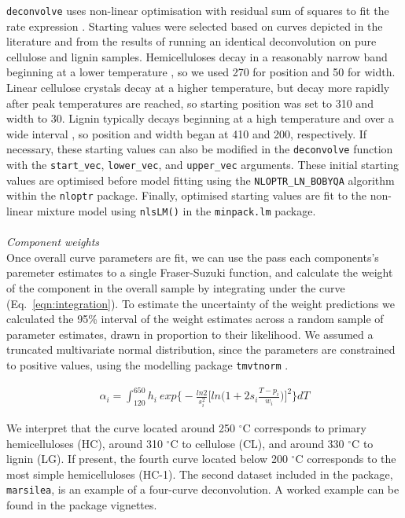 \documentclass{jors}\usepackage[]{graphicx}\usepackage[]{color}
\begin{document}
\verb|deconvolve| uses non-linear optimisation with residual sum of squares to fit the rate expression \citetext{as in \citealp{cheng2015}}. Starting values were selected based on curves depicted in the literature \citep{muller-hagedorn2007} and from the results of running an identical deconvolution on pure cellulose and lignin samples. Hemicelluloses decay in a reasonably narrow band beginning at a lower temperature \citep{muller-hagedorn2007}, so we used 270 for position and 50 for width. Linear cellulose crystals decay at a higher temperature, but decay more rapidly after peak temperatures are reached, so starting position was set to 310 and width to 30. Lignin typically decays beginning at a high temperature and over a wide interval \citep{chen2015}, so position and width began at 410 and 200, respectively. If necessary, these starting values can also be modified in the \verb|deconvolve| function with the \verb|start_vec|, \verb|lower_vec|, and \verb|upper_vec| arguments. These initial starting values are optimised before model fitting using the \verb|NLOPTR_LN_BOBYQA| algorithm \citep{bobyqa} within the \verb|nloptr| \citep{nloptr} package. Finally, optimised starting values are fit to the non-linear mixture model using \verb|nlsLM()| in the \verb|minpack.lm| \citep{minpack.lm} package.\\
\\
\textit{Component weights}\\
Once overall curve parameters are fit, we can use the pass each components's paremeter estimates to a single Fraser-Suzuki function, and calculate the weight of the component in the overall sample by integrating under the curve (Eq.~\ref{eqn:integration}). To estimate the uncertainty of the weight predictions we calculated the 95\% interval of the weight estimates across a random sample of parameter estimates, drawn in proportion to their likelihood. We assumed a truncated multivariate normal distribution, since the parameters are constrained to positive values, using the modelling package \verb|tmvtnorm| \citep{tmvtnorm}.

\begin{gather}\label{eqn:integration}
	\alpha_i = \int_{120}^{650} h_i\ exp\bigg\{-\frac{ln2}{s_i^2}\Big[ln\Big(1 + 2s_i \frac{T - p_i}{w_i}\Big)\Big]^2\bigg\} dT
\end{gather}

We interpret that the curve located around 250 $^\circ$C corresponds to primary hemicelluloses (HC), around 310 $^\circ$C to cellulose (CL), and around 330 $^\circ$C to lignin (LG). If present, the fourth curve located below 200 $^\circ$C corresponds to the most simple hemicelluloses (HC-1). The second dataset included in the package, \verb|marsilea|, is an example of a four-curve deconvolution. A worked example can be found in the package vignettes.
\end{document}
